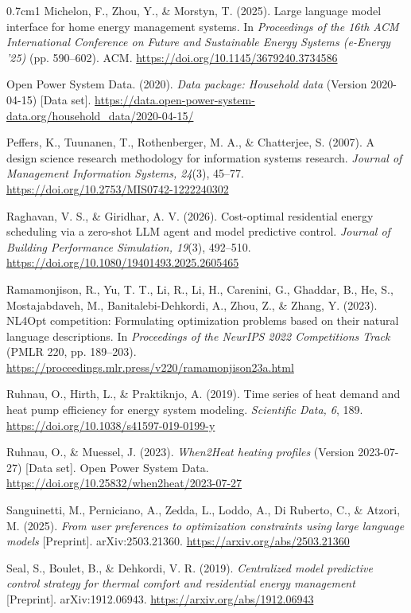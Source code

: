 \documentclass[12pt,a4paper]{report}
\begin{document}
\begin{hangparas}{0.7cm}{1}
Michelon, F., Zhou, Y., \& Morstyn, T. (2025). Large language model
interface for home energy management systems. In \textit{Proceedings of
the 16th ACM International Conference on Future and Sustainable Energy
Systems (e-Energy '25)} (pp. 590--602). ACM.
\url{https://doi.org/10.1145/3679240.3734586}

Open Power System Data. (2020). \textit{Data package: Household data}
(Version 2020-04-15) [Data set].
\url{https://data.open-power-system-data.org/household_data/2020-04-15/}

Peffers, K., Tuunanen, T., Rothenberger, M. A., \& Chatterjee, S.
(2007). A design science research methodology for information systems
research. \textit{Journal of Management Information Systems, 24}(3),
45--77. \url{https://doi.org/10.2753/MIS0742-1222240302}

Raghavan, V. S., \& Giridhar, A. V. (2026). Cost-optimal residential
energy scheduling via a zero-shot LLM agent and model predictive
control. \textit{Journal of Building Performance Simulation, 19}(3),
492--510. \url{https://doi.org/10.1080/19401493.2025.2605465}

Ramamonjison, R., Yu, T. T., Li, R., Li, H., Carenini, G., Ghaddar, B.,
He, S., Mostajabdaveh, M., Banitalebi-Dehkordi, A., Zhou, Z., \& Zhang,
Y. (2023). NL4Opt competition: Formulating optimization problems based
on their natural language descriptions. In \textit{Proceedings of the
NeurIPS 2022 Competitions Track} (PMLR 220, pp. 189--203).
\url{https://proceedings.mlr.press/v220/ramamonjison23a.html}

Ruhnau, O., Hirth, L., \& Praktiknjo, A. (2019). Time series of heat
demand and heat pump efficiency for energy system modeling.
\textit{Scientific Data, 6}, 189.
\url{https://doi.org/10.1038/s41597-019-0199-y}

Ruhnau, O., \& Muessel, J. (2023). \textit{When2Heat heating profiles}
(Version 2023-07-27) [Data set]. Open Power System Data.
\url{https://doi.org/10.25832/when2heat/2023-07-27}

Sanguinetti, M., Perniciano, A., Zedda, L., Loddo, A., Di Ruberto, C.,
\& Atzori, M. (2025). \textit{From user preferences to optimization
constraints using large language models} [Preprint]. arXiv:2503.21360.
\url{https://arxiv.org/abs/2503.21360}

Seal, S., Boulet, B., \& Dehkordi, V. R. (2019). \textit{Centralized
model predictive control strategy for thermal comfort and residential
energy management} [Preprint]. arXiv:1912.06943.
\url{https://arxiv.org/abs/1912.06943}


\end{hangparas}
\end{document}
